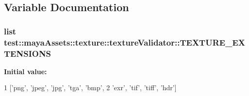 \subsection{\-Variable \-Documentation}
\hypertarget{namespacetest_1_1mayaAssets_1_1texture_1_1textureValidator_a261a761ef073c677bdc19beca68e6276}{
\subsubsection[{\-T\-E\-X\-T\-U\-R\-E\-\_\-\-E\-X\-T\-E\-N\-S\-I\-O\-N\-S}]{\setlength{\rightskip}{0pt plus 5cm}list {\bf test\-::maya\-Assets\-::texture\-::texture\-Validator\-::\-T\-E\-X\-T\-U\-R\-E\-\_\-\-E\-X\-T\-E\-N\-S\-I\-O\-N\-S}}}\label{dd/d6e/namespacetest_1_1mayaAssets_1_1texture_1_1textureValidator_a261a761ef073c677bdc19beca68e6276}
{\bfseries \-Initial value\-:}
\begin{DoxyCode}
1 ['png', 'jpeg', 'jpg', 'tga', 'bmp',
2                       'exr', 'tif', 'tiff', 'hdr']
\end{DoxyCode}
